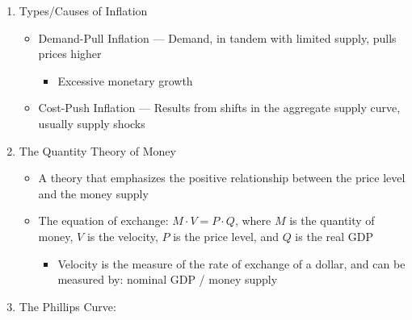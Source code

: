 \documentclass[12pt]{article}
\begin{document}
\begin{enumerate}
\begin{itemize}
    \end{itemize}

  \item Types/Causes of Inflation

    \begin{itemize}

      \item Demand-Pull Inflation — Demand, in tandem with limited supply, pulls prices higher

        \begin{itemize}

          \item Excessive monetary growth

        \end{itemize}

      \item Cost-Push Inflation — Results from shifts in the aggregate supply curve, usually supply shocks

    \end{itemize}

  \item The Quantity Theory of Money

    \begin{itemize}

      \item A theory that emphasizes the positive relationship between the price level and the money supply

      \item The equation of exchange: $M\cdot V = P\cdot Q$, where $M$ is the quantity of money, $V$ is the velocity, $P$ is the price level, and $Q$ is the real GDP

        \begin{itemize}

          \item Velocity is the measure of the rate of exchange of a dollar, and can be measured by: nominal GDP / money supply

        \end{itemize}

    \end{itemize}

  \item The Phillips Curve:

    \begin{center}
    \end{center}


\end{enumerate}
\end{document}

